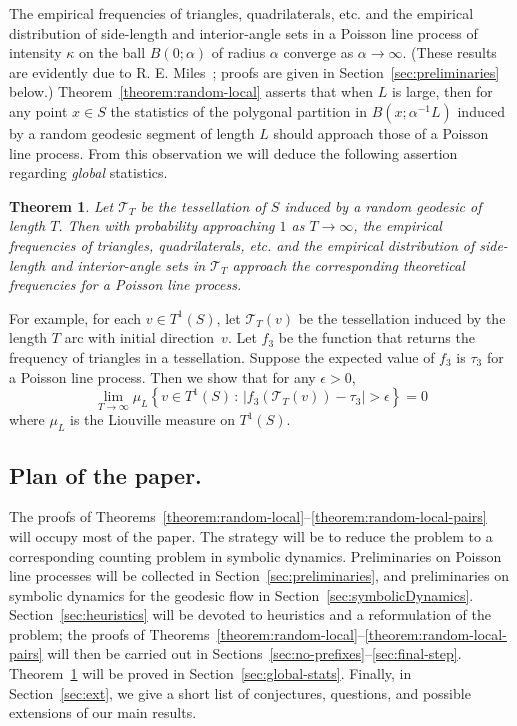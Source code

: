 \documentclass[10pt]{amsart}
\newtheorem{theo}{Theorem}[section]
\theoremstyle{definition}\newtheorem{defi}[theo]{Definition}\newtheorem{rema}[theo]{Remark}\newtheorem{exam}[theo]{Example}\newtheorem{exem}[theo]{Example}\newtheorem{nota}[theo]{Notation}
\begin{document}
The empirical frequencies of triangles, quadrilaterals, etc. and the empirical distribution of side-length and interior-angle sets in a Poisson line process of intensity $\kappa$ on the ball $B (0; \alpha)$ of radius $\alpha$ converge as $\alpha \rightarrow \infty$. (These results are evidently due to R. E. Miles~\cite{miles:pnas1,miles:pnas2}; proofs are given in Section~\ref{sec:preliminaries} below.) Theorem~\ref{theorem:random-local} asserts that when $L$ is large, then for any point $x\in S$ the statistics of the polygonal partition in $B (x;\alpha^{-1}L)$ induced by a random geodesic segment of length $L$ should approach those of a Poisson line process. From this observation we will deduce the following assertion regarding \emph{global} statistics.


\begin{theo}\label{theorem:global-stats}
Let $\mathcal{T}_{T}$ be the tessellation of $S$ induced by a random geodesic of length $T$. Then with probability approaching $1$ as $T \rightarrow \infty$, the empirical frequencies of triangles, quadrilaterals, etc. and the empirical distribution of side-length and interior-angle sets in $\mathcal{T}_{T}$ approach the corresponding theoretical frequencies for a Poisson line process.
\end{theo}

For example, for each $v \in T^1(S)$, let $\mathcal T_T(v)$ be the tessellation induced by the length $T$ arc with initial direction~$v$. Let $f_3$ be the function that returns the frequency of triangles in a tessellation. Suppose the expected value of $f_3$ is $\tau_3$ for a Poisson line process. Then we show that for any $\epsilon > 0$,
\[
\lim_{T \to \infty} \mu_L \left\{v \in T^1(S) \,:\, |f_3(\mathcal T_T(v)) - \tau_3| > \epsilon\right\} = 0
\]
where $\mu_L$ is the Liouville measure on $T^1(S)$.

\subsection*{Plan of the paper.}
The proofs of Theorems~\ref{theorem:random-local}--\ref{theorem:random-local-pairs} will occupy most of the paper. The strategy will be to reduce the problem to a corresponding counting problem in symbolic dynamics. Preliminaries on Poisson line processes will be collected in Section~\ref{sec:preliminaries}, and preliminaries on symbolic dynamics for the geodesic flow in Section~\ref{sec:symbolicDynamics}. Section~\ref{sec:heuristics} will be devoted to heuristics and a reformulation of the problem; the proofs of Theorems~\ref{theorem:random-local}--\ref{theorem:random-local-pairs} will then be carried out in Sections~\ref{sec:no-prefixes}--\ref{sec:final-step}. Theorem~\ref{theorem:global-stats} will be proved in Section~\ref{sec:global-stats}. Finally, in Section~\ref{sec:ext}, we give a short list of conjectures, questions, and possible extensions of our main results.
\end{document}
